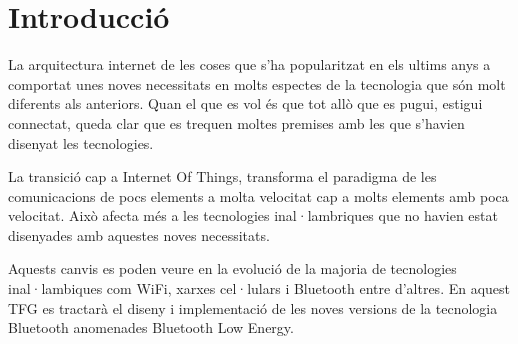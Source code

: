 \cleardoublepage
{}
\chapter*{Introducció}
La arquitectura internet de les coses que s'ha popularitzat en els ultims anys a comportat unes noves necessitats en molts espectes de la tecnologia que són molt diferents als anteriors. Quan el que es vol és que tot allò que es pugui, estigui connectat, queda clar que es trequen moltes premises amb les que s'havien disenyat les tecnologies.

La transició cap a Internet Of Things, transforma el paradigma de les comunicacions de pocs elements a molta velocitat cap a molts elements amb poca velocitat. Això afecta més a les tecnologies inal·lambriques que no havien estat disenyades amb aquestes noves necessitats.

Aquests canvis es poden veure en la evolució de la majoria de tecnologies inal·lambiques com WiFi, xarxes cel·lulars i Bluetooth entre d'altres. En aquest TFG es tractarà el diseny i implementació de les noves versions de la tecnologia Bluetooth anomenades Bluetooth Low Energy.

